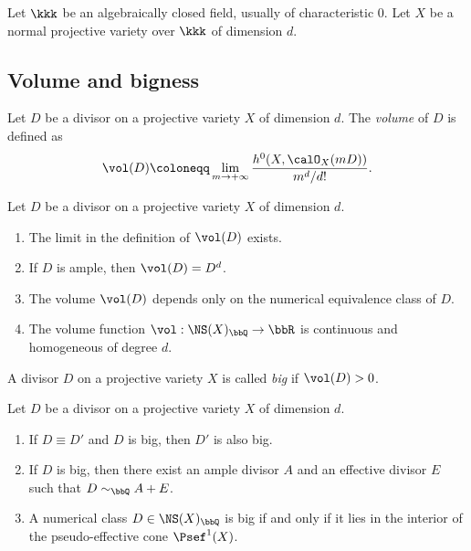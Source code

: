 Let $\kkk$ be an algebraically closed field, usually of characteristic $0$.
    Let $X$ be a normal projective variety over $\kkk$ of dimension $d$.
    
\subsection{Volume and bigness}

    \begin{definition}
        Let $D$ be a divisor on a projective variety $X$ of dimension $d$.
        The \emph{volume} of $D$ is defined as
        \[ \vol(D) \coloneqq \lim_{m \to +\infty} \frac{h^0(X, \calO_X(mD))}{m^d/d!}. \]
    \end{definition}


    \begin{theorem}
        Let $D$ be a divisor on a projective variety $X$ of dimension $d$.
        \begin{enumerate}
            \item The limit in the definition of $\vol(D)$ exists.
            \item If $D$ is ample, then $\vol(D) = D^d$.
            \item The volume $\vol(D)$ depends only on the numerical equivalence class of $D$.
            \item The volume function $\vol: \NS(X)_\bbQ \to \bbR$ is continuous and homogeneous of degree $d$.
        \end{enumerate}
    \end{theorem}


    \begin{definition}
        A divisor $D$ on a projective variety $X$ is called \emph{big} if $\vol(D) > 0$.
    \end{definition}


    \begin{theorem}
        Let $D$ be a divisor on a projective variety $X$ of dimension $d$.
        \begin{enumerate}
            \item If $D \equiv D'$ and $D$ is big, then $D'$ is also big.
            \item If $D$ is big, then there exist an ample divisor $A$ and an effective divisor $E$ such that $D \sim_\bbQ A + E$.
            \item A numerical class $D \in \NS(X)_\bbQ$ is big if and only if it lies in the interior of the pseudo-effective cone $\Psef^1(X)$.
        \end{enumerate}
    \end{theorem}

